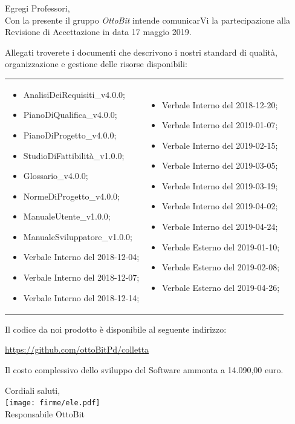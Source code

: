 \documentclass[11pt,a4paper]{article}
\begin{document}
\begin{minipage}{0.95\textwidth}
Egregi Professori,\\
Con la presente il gruppo \textit{OttoBit} intende comunicarVi la partecipazione alla Revisione di Accettazione in data 17 maggio 2019.

Allegati troverete i documenti che descrivono i nostri standard di qualità, organizzazione e gestione delle risorse disponibili:

\begin{tabular}{p{}|p{}}

	\begin{itemize}
	\item AnalisiDeiRequisiti\_v4.0.0;
	\item PianoDiQualifica\_v4.0.0;
	\item PianoDiProgetto\_v4.0.0;
	\item StudioDiFattibilità\_v1.0.0;
	\item Glossario\_v4.0.0;
	\item NormeDiProgetto\_v4.0.0;
	\item ManualeUtente\_v1.0.0;
	\item ManualeSviluppatore\_v1.0.0;
	\item Verbale Interno del 2018-12-04;
	\item Verbale Interno del 2018-12-07;
	\item Verbale Interno del 2018-12-14;
	\end{itemize}
	& 
	\begin{itemize}
		
		\item Verbale Interno del 2018-12-20;
		\item Verbale Interno del 2019-01-07;
		\item Verbale Interno del 2019-02-15;
		\item Verbale Interno del 2019-03-05;
		\item Verbale Interno del 2019-03-19;
		\item Verbale Interno del 2019-04-02;
		\item Verbale Interno del 2019-04-24;
		\item Verbale Esterno del 2019-01-10;
		\item Verbale Esterno del 2019-02-08;
		\item Verbale Esterno del 2019-04-26;
	\end{itemize}\\
\end{tabular}

Il codice da noi prodotto è disponibile al seguente indirizzo:
\begin{center}
	\url{https://github.com/ottoBitPd/colletta}
\end{center}
Il costo complessivo dello sviluppo del Software ammonta a 14.090,00 euro.

\end{minipage}

	\hfill
	\begin{minipage}{0.3\textwidth}\raggedleft
	\vspace{3em}
	Cordiali saluti,\\
	\vspace{1em}
	\texttt{[image: firme/ele.pdf]}
	\\Responsabile OttoBit
	
\end{minipage}
\end{document}
